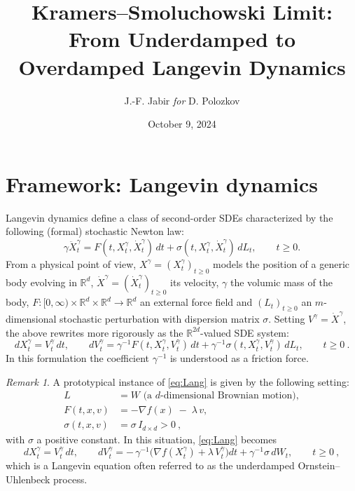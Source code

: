 \documentclass[12pt]{article}
\numberwithin{equation}{section}
\theoremstyle{remark}
\newtheorem{remark}{Remark}
\begin{document}
\title{Kramers--Smoluchowski Limit: From Underdamped to Overdamped Langevin Dynamics}
\author{J.-F. Jabir \textit{for} D. Polozkov}
\date{October 9, 2024}
\maketitle

\section{Framework: Langevin dynamics}

Langevin dynamics define a class of second-order SDEs characterized by the following (formal) stochastic Newton law: 
\[ 
\gamma \ddot{X}_t^\gamma = F(t, X_t^\gamma, \dot{X}_t^\gamma)\,dt + \sigma(t, X_t^\gamma, \dot{X}_t^\gamma)\,dL_t, \qquad t \ge 0. 
\] 
From a physical point of view, $X^\gamma = (X_t^\gamma)_{t\ge0}$ models the position of a generic body evolving in $\mathbb{R}^d$, $\dot{X}^\gamma = (\dot{X}_t^\gamma)_{t\ge0}$ its velocity, $\gamma$ the volumic mass of the body, $F: [0,\infty)\times \mathbb{R}^d \times \mathbb{R}^d \to \mathbb{R}^d$ an external force field and $(L_t)_{t\ge0}$ an $m$-dimensional stochastic perturbation with dispersion matrix $\sigma$. Setting $V^\gamma = \dot{X}^\gamma$, the above rewrites more rigorously as the $\mathbb{R}^{2d}$-valued SDE system: 
\begin{equation}\label{eq:Lang}
dX_t^\gamma = V_t^\gamma\,dt, \qquad 
dV_t^\gamma = \gamma^{-1} F(t, X_t^\gamma, V_t^\gamma)\,dt + \gamma^{-1}\sigma(t, X_t^\gamma, V_t^\gamma)\,dL_t, \qquad t \ge 0~.
\tag{1.1}
\end{equation} 
In this formulation the coefficient $\gamma^{-1}$ is understood as a friction force.

\begin{remark}
A prototypical instance of \eqref{eq:Lang} is given by the following setting: 
\begin{equation}
\begin{aligned}
L &= W \text{ (a $d$-dimensional Brownian motion)},\\
F(t,x,v) &= -\nabla f(x)\;-\;\lambda\,v,\\
\sigma(t,x,v) &= \sigma\,I_{d\times d} > 0~,
\end{aligned}
\tag{1.2}
\end{equation}
with $\sigma$ a positive constant. In this situation, \eqref{eq:Lang} becomes 
\begin{equation}\label{eq:OU}
dX_t^\gamma = V_t^\gamma\,dt, \qquad 
dV_t^\gamma = -\,\gamma^{-1}\!\big(\nabla f(X_t^\gamma) + \lambda\,V_t^\gamma\big)dt + \gamma^{-1}\sigma\,dW_t, \qquad t \ge 0~,
\tag{1.3}
\end{equation}
which is a Langevin equation often referred to as the underdamped Ornstein–Uhlenbeck process.
\end{remark}
\end{document}
